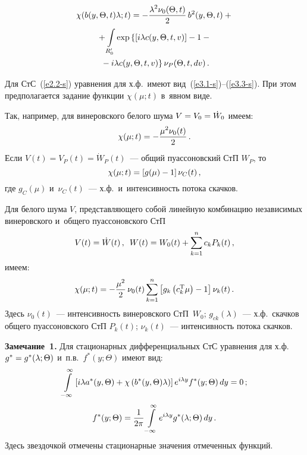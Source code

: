 \begin{multicols}{2}
    \vspace*{-12pt}
    
    \noindent
    \begin{multline*}
    \chi(b(y,\Theta,t)\lambda;t) =
    -\displaystyle\frac{\displaystyle \lambda^2 \nu_0 (\Theta,t)\mathstrut}{\displaystyle 2\mathstrut}\, b^2 (y,\Theta,t)+{}\\
{}+ \int\limits_{R_0'} \exp \left\{
\left[ i\lambda c(y,\Theta,t,v)\right] -
    1-{}\right.\\
\left.    {}-i\lambda c(y,\Theta,t,v)\right\} \nu_P (\Theta,t,dv)\,.
    \end{multline*}

Для СтС~(\ref{e2.2-s}) уравнения для х.ф.\ имеют вид~(\ref{e3.1-s})--(\ref{e3.3-s}). 
При этом предполагается задание функции $\chi(\mu;t)$ в~явном виде.

Так, например, для винеровского белого шума $V\hm=V_0\hm=\dot W_0$ имеем:
    \begin{equation*}
    \chi (\mu;t) =- \displaystyle\frac{\displaystyle \mu^2 \nu_0(t)\mathstrut}{\displaystyle 2\mathstrut}\,.
    \end{equation*}
Если $V(t)= V_P(t) = \dot W_P (t)$~--- общий пуассоновский СтП $W_P$, то
    \begin{equation*}
    \chi (\mu;t) = \left[ g(\mu) -1\right] \nu_C (t)\,,
    \end{equation*}
где $g_C (\mu)$ и~$\nu_C(t)$~--- х.ф.\ и~интенсивность потока скачков.

Для белого шума $V$, представляющего 
собой линейную комбинацию независимых винеровского и~общего пуассоновского СтП
    \begin{equation*}
    V(t)= \dot W(t)\,,\enskip 
    W(t) = W_0(t) + \sum\limits_{k=1}^n c_k P_k (t)\,,
    \end{equation*}
имеем:
    \begin{equation*}
    \chi(\mu;t) = - \displaystyle\frac{\displaystyle  \mu^2\mathstrut}{\displaystyle 2\mathstrut}\, \nu_0 (t) 
    \sum\limits_{k=1}^n \left[ g_k\left(c_k^{\mathrm{T}} \mu \right) - 1 \right] \nu_k(t)\,.
\end{equation*}
Здесь $\nu_0(t)$~--- интенсивность винеровского СтП~$W_0$; 
$g_{ck} (\lambda)$~--- х.ф.\ скачков общего пуассоновского СтП  $P_k (t)$; 
$\nu_k(t)$~--- интенсивность потока скачков.

\smallskip

\noindent
\textbf{Замечание~1.}
   Для стационарных дифференциальных СтС уравнения для  х.ф.\
    $g^*\hm=g^*(\lambda;\Theta)$  и~п.в.\ $f^*(y;\Theta)$ имеют вид:
       \begin{equation*}
    \int\limits_{-\infty}^\infty \left[ i \lambda a^* (y,\Theta) + 
    \chi\left( b^*(y,\Theta)\lambda\right)\right] e^{i\lambda y} f^* ( y;\Theta) \,dy =0\,;
    \end{equation*}
      \begin{equation*}
    f^*(y;\Theta) = \displaystyle\frac{\displaystyle 1\mathstrut}{\displaystyle 2\pi\mathstrut} \int\limits_{-\infty}^\infty e^{i\lambda y} g^* ( \lambda;\Theta)\, dy\,.
    \end{equation*}
Здесь звездочкой отмечены стационарные значения отмеченных функций.



\end{multicols}
